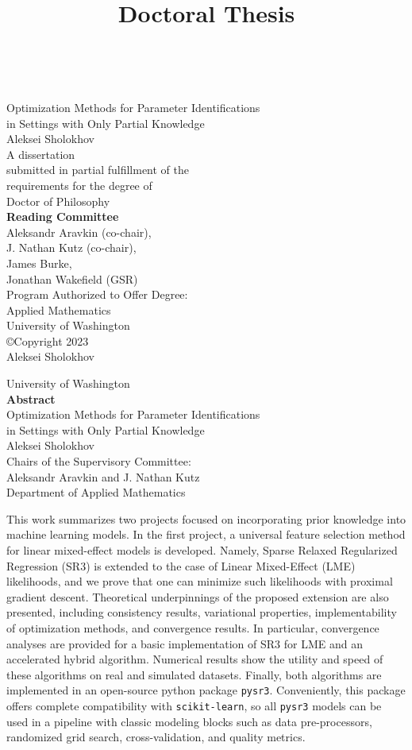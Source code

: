 \documentclass[12pt,a4paper]{book}
\newcommand{\userName}{Aleksei Sholokhov}
\newcommand{\department}{Department of Applied Mathematics}
\newcommand{\institution}{University of Washington}
\newcommand{\doctitle}{Doctoral Thesis}
\newcommand{\projectNameLong}{Optimization Methods for Parameter Identifications \\ in Settings with Only Partial Knowledge}
\numberwithin{equation}{section} %
\numberwithin{figure}{section} %
\numberwithin{table}{section} %
\begin{document}
\title{\doctitle}
~\\
{\center
{\large 
{\large
\projectNameLong
}
\\[10mm]
\userName
\\[20mm]
{A dissertation \\
 submitted in partial fulfillment of the\\ requirements for the degree of}
\\[5mm]
{Doctor of Philosophy}
\\[20mm]
{\center
\textbf{Reading Committee}\\
Aleksandr Aravkin (co-chair),\\
J. Nathan Kutz (co-chair), \\
James Burke, \\
Jonathan Wakefield (GSR)
}
\\[20mm]
Program Authorized to Offer Degree:
\\[5mm]
Applied Mathematics
\\[5mm]
\institution
}
\\[10mm]
©Copyright 2023\\
\userName

}  

\newpage
{
\center 
\institution
\\[10mm]
\textbf{Abstract}
\\[10mm]
\projectNameLong
\\[10mm]
\userName
\\[10mm]
Chairs of the Supervisory Committee:\\
Aleksandr Aravkin and J. Nathan Kutz\\
\department
\\[10mm]
}

This work summarizes two projects focused on incorporating prior knowledge into machine learning models. In the first project, a universal feature selection method for linear mixed-effect models is developed. Namely, Sparse Relaxed Regularized Regression (SR3) is extended to the case of Linear Mixed-Effect (LME) likelihoods, and we prove that one can minimize such likelihoods with proximal gradient descent. Theoretical underpinnings of the proposed extension are also presented, including consistency results, variational properties, implementability of optimization methods, and convergence results. In particular, convergence analyses are provided for a basic implementation of SR3 for LME and an accelerated hybrid algorithm. Numerical results show the utility and speed of these algorithms on real and simulated datasets. Finally, both algorithms are implemented in an open-source python package \texttt{pysr3}. Conveniently, this package offers complete compatibility with \texttt{scikit-learn}, so all \texttt{pysr3} models can be used in a pipeline with classic modeling blocks such as data pre-processors, randomized grid search, cross-validation, and quality metrics.
\end{document}
